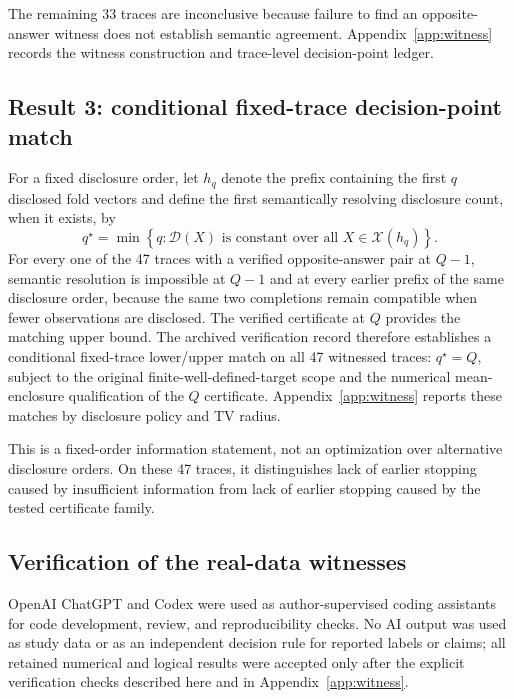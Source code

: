 \documentclass[preprint,11pt]{elsarticle}
\begin{document}
The remaining 33 traces are inconclusive because failure to find an opposite-answer witness does not establish semantic agreement. Appendix~\ref{app:witness} records the witness construction and trace-level decision-point ledger.

\subsection{Result 3: conditional fixed-trace decision-point match}

For a fixed disclosure order, let $h_q$ denote the prefix containing the first $q$ disclosed fold vectors and define the first semantically resolving disclosure count, when it exists, by
\begin{equation}\label{eq:qstar}
q^\star=\min\left\{q:\mathcal D(X)\text{ is constant over all }X\in\mathcal X(h_q)\right\}.
\end{equation}
For every one of the 47 traces with a verified opposite-answer pair at $Q-1$, semantic resolution is impossible at $Q-1$ and at every earlier prefix of the same disclosure order, because the same two completions remain compatible when fewer observations are disclosed. The verified certificate at $Q$ provides the matching upper bound. The archived verification record therefore establishes a conditional fixed-trace lower/upper match on all 47 witnessed traces: $q^\star=Q$, subject to the original finite-well-defined-target scope and the numerical mean-enclosure qualification of the $Q$ certificate. Appendix~\ref{app:witness} reports these matches by disclosure policy and TV radius.

This is a fixed-order information statement, not an optimization over alternative disclosure orders. On these 47 traces, it distinguishes lack of earlier stopping caused by insufficient information from lack of earlier stopping caused by the tested certificate family.

\subsection{Verification of the real-data witnesses}\label{sec:verification}

OpenAI ChatGPT and Codex were used as author-supervised coding assistants for code development, review, and reproducibility checks. No AI output was used as study data or as an independent decision rule for reported labels or claims; all retained numerical and logical results were accepted only after the explicit verification checks described here and in Appendix~\ref{app:witness}.
\end{document}
